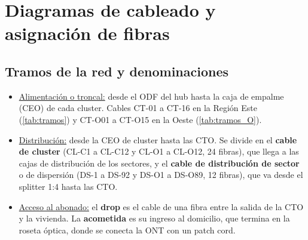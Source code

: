 \section{Diagramas de cableado y asignación de fibras}
\label{sec:cableado}

\subsection{Tramos de la red y denominaciones}
\begin{itemize}
    \item \underline{Alimentación o troncal:} desde el ODF del hub hasta la caja de empalme (CEO) de cada cluster. Cables CT-01 a CT-16 en la Región Este (\autoref{tab:tramos}) y CT-O01 a CT-O15 en la Oeste (\autoref{tab:tramos_O}).
    \item \underline{Distribución:} desde la CEO de cluster hasta las CTO. Se divide en el \textbf{cable de cluster} (CL-C1 a CL-C12 y CL-O1 a CL-O12, 24 fibras), que llega a las cajas de distribución de los sectores, y el \textbf{cable de distribución de sector} o de dispersión (DS-1 a DS-92 y DS-O1 a DS-O89, 12 fibras), que va desde el splitter 1:4 hasta las CTO.
    \item \underline{Acceso al abonado:} el \textbf{drop} es el cable de una fibra entre la salida de la CTO y la vivienda. La \textbf{acometida} es su ingreso al domicilio, que termina en la roseta óptica, donde se conecta la ONT con un patch cord.
\end{itemize}

